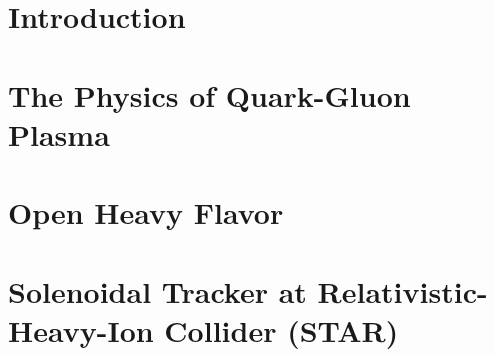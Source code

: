 \documentclass[a4paper,titlepage,11pt,twoside,openright]{report} %
\newcommand{\Listofabbrev}{
                           \printnomenclature
                           \newpage
                          }
\newcommand{\Lambdac}{\ensuremath{{\Lambda_\text{c}}}}
\begin{document}
\thispagestyle{fancy}
\renewcommand{\footrulewidth}{0.4pt}


% 


\newpage \cleardoublepage
% 

\cleardoublepage
\listoffigures
\cleardoublepage
\listoftables
\cleardoublepage
\tableofcontents 
\cleardoublepage
\pagestyle{fancy}
\fancyhead{} %
\fancyhead[RE]{\rightmark}
\fancyhead[LO]{\leftmark}

\renewcommand{\footrulewidth}{0.4pt}
\cleardoublepage
{}
{}
\setcounter{page}{1}
\Listofabbrev \newpage
\cleardoublepage
\chapter*{Introduction}



\cleardoublepage
\chapter{The Physics of Quark-Gluon Plasma\label{QGPintro}}



\cleardoublepage
\chapter{Open Heavy Flavor\label{HFintro}}




\cleardoublepage
\chapter{Solenoidal Tracker at Relativistic-Heavy-Ion Collider (STAR)\label{STARchapter}}

\end{document}
